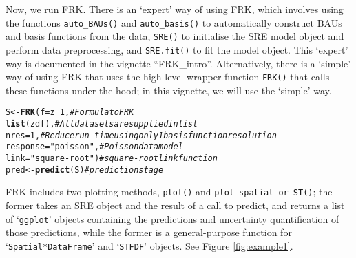 \documentclass{article}\usepackage[]{graphicx}\usepackage[]{color}
\makeatletter
\newcommand{\hlnum}[1]{\textcolor[rgb]{0.686,0.059,0.569}{#1}}%
\newcommand{\hlstr}[1]{\textcolor[rgb]{0.192,0.494,0.8}{#1}}%
\newcommand{\hlcom}[1]{\textcolor[rgb]{0.678,0.584,0.686}{\textit{#1}}}%
\newcommand{\hlopt}[1]{\textcolor[rgb]{0,0,0}{#1}}%
\newcommand{\hlstd}[1]{\textcolor[rgb]{0.345,0.345,0.345}{#1}}%
\newcommand{\hlkwb}[1]{\textcolor[rgb]{0.69,0.353,0.396}{#1}}%
\newcommand{\hlkwc}[1]{\textcolor[rgb]{0.333,0.667,0.333}{#1}}%
\newcommand{\hlkwd}[1]{\textcolor[rgb]{0.737,0.353,0.396}{\textbf{#1}}}%
\newenvironment{kframe}{%
 \def\at@end@of@kframe{}%
 \ifinner\ifhmode%
  \def\at@end@of@kframe{\end{minipage}}%
  \begin{minipage}{\columnwidth}%
 \fi\fi%
 \def\FrameCommand##1{\hskip\@totalleftmargin \hskip-\fboxsep
 \colorbox{shadecolor}{##1}\hskip-\fboxsep
     \hskip-\linewidth \hskip-\@totalleftmargin \hskip\columnwidth}%
 \MakeFramed {\advance\hsize-\width
   \@totalleftmargin\z@ \linewidth\hsize
   \@setminipage}}%
 {\par\unskip\endMakeFramed%
 \at@end@of@kframe}
\newenvironment{knitrout}{}{} %
\newcommand{\class}[1]{`\code{#1}'}
\newcommand{\fct}[1]{\code{#1()}}
\let\code=\texttt
\newcommand{\pkg}[1]{{\fontseries{b}\selectfont #1}}
\makeatother
\begin{document}
Now, we run \pkg{FRK}. There is an `expert' way of using \pkg{FRK}, which involves using the functions \fct{auto\_BAUs} and \fct{auto\_basis} to automatically construct BAUs and basis functions from the data, \fct{SRE} to initialise the SRE model object and perform data preprocessing, and \fct{SRE.fit} to fit the model object. 
 This `expert' way is documented in the vignette ``FRK\_intro''. 
 Alternatively, there is a `simple' way of using \pkg{FRK} that uses the high-level wrapper function \fct{FRK} that calls these functions under-the-hood; in this vignette, we will use the `simple' way. 
 
\begin{knitrout}
\color{fgcolor}\begin{kframe}
\begin{alltt}
\hlstd{S} \hlkwb{<-} \hlkwd{FRK}\hlstd{(}\hlkwc{f} \hlstd{= z} \hlopt{~} \hlnum{1}\hlstd{,}               \hlcom{# Formula to FRK}
         \hlkwd{list}\hlstd{(zdf),}               \hlcom{# All datasets are supplied in list}
         \hlkwc{nres} \hlstd{=} \hlnum{1}\hlstd{,}                \hlcom{# Reduce run-time using only 1 basis function resolution}
         \hlkwc{response} \hlstd{=} \hlstr{"poisson"}\hlstd{,}    \hlcom{# Poisson data model}
         \hlkwc{link} \hlstd{=} \hlstr{"square-root"}\hlstd{)}    \hlcom{# square-root link function}
\hlstd{pred} \hlkwb{<-} \hlkwd{predict}\hlstd{(S)}                \hlcom{# prediction stage}
\end{alltt}
\end{kframe}
\end{knitrout}

\pkg{FRK} includes two plotting methods, \fct{plot} and \fct{plot\_spatial\_or\_ST}; the former takes an SRE object and the result of a call to predict, and returns a list of \class{ggplot} objects containing the predictions and uncertainty quantification of those predictions, while the former is a general-purpose function for \class{Spatial*DataFrame} and \class{STFDF} objects. See Figure \ref{fig:example1}.
\end{document}
